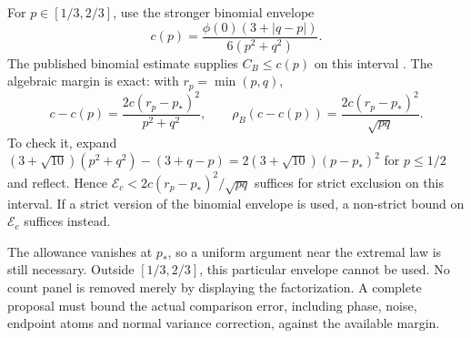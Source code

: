 For $p\in[1/3,2/3]$, use the stronger binomial envelope
\[
 c(p)=\frac{\phi(0)(3+|q-p|)}{6(p^2+q^2)}.
\]
The published binomial estimate supplies $C_B\le c(p)$ on this interval
\cite{Schulz2016,MattnerShevtsova2019}. The algebraic margin is exact:
with $r_p=\min(p,q)$,
\[
 c-c(p)=\frac{2c(r_p-p_*)^2}{p^2+q^2},\qquad
 \rho_B(c-c(p))=\frac{2c(r_p-p_*)^2}{\sqrt{pq}}.
\]
To check it, expand
$(3+\sqrt{10})(p^2+q^2)-(3+q-p)
=2(3+\sqrt{10})(p-p_*)^2$ for $p\le1/2$ and reflect.
Hence $\mathcal E_c<2c(r_p-p_*)^2/\sqrt{pq}$ suffices for strict
exclusion on this interval. If a strict version of the binomial envelope
is used, a non-strict bound on $\mathcal E_c$ suffices instead.

The allowance vanishes at $p_*$, so a uniform argument near the extremal
law is still necessary. Outside $[1/3,2/3]$, this particular envelope
cannot be used. No count panel is removed merely by displaying the
factorization. A complete proposal must bound the actual comparison error,
including phase, noise, endpoint atoms and normal variance correction,
against the available margin.
